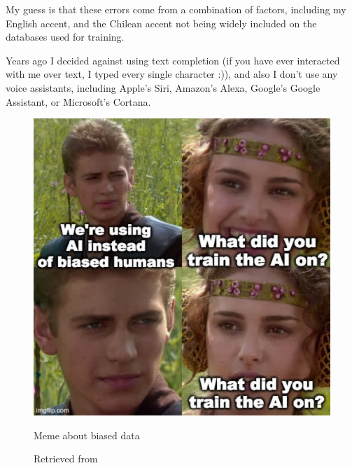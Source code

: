 My guess is that these errors come from a combination of factors, including my English accent, and the Chilean accent not being widely included on the databases used for training.

Years ago I decided against using text completion (if you have ever interacted with me over text, I typed every single character :)), and also I don't use any voice assistants, including Apple's Siri, Amazon's Alexa,  Google's Google Assistant, or Microsoft's Cortana.

\begin{figure}[ht]
  \centering
  \includegraphics[width=0.75\linewidth,height=0.25\textheight,keepaspectratio]{images/meme-star-wars.jpg}
  \caption{Meme about biased data}
  \caption*{Retrieved from \cite{website-twitter-janellecshane-meme}}
  \label{fig:meme-star-wars}
\end{figure}

